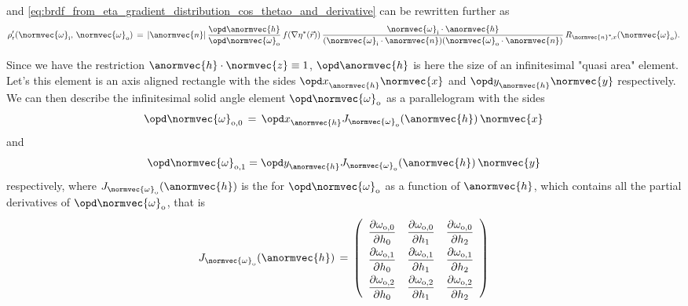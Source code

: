 %
and \eqref{eq:brdf_from_eta_gradient_distribution_cos_thetao_and_derivative} can be rewritten further as
%
\begin{equation}  \label{eq:brdf_from_eta_gradient_distribution_derivative}
\rho'_{\text{r}}(\normvec{\omega}_{\text{i}},\, \normvec{\omega}_{\text{o}}) \,=\, |\anormvec{n}|\,\frac{\opd\anormvec{h}}{\opd\normvec{\omega}_{\text{o}}}\,f(\nabla\eta^*(\vec{r}))\,\frac{\normvec{\omega}_{\text{i}}\cdot\anormvec{h}}{(\normvec{\omega}_{\text{i}}\cdot\anormvec{n})(\normvec{\omega}_{\text{o}}\cdot\anormvec{n})}\,R_{\normvec{n}^*\!,x}(\normvec{\omega}_{\text{o}}).
\end{equation}

Since we have the restriction $\anormvec{h}\cdot\normvec{z}\equiv 1$, $\opd\anormvec{h}$ is here the size of an infinitesimal "quasi area" element. Let's \assume this element is an axis aligned rectangle with the sides $\opd x_{\anormvec{h}}^{\,}\normvec{x}$ and $\opd y_{\anormvec{h}}^{\,}\normvec{y}$ respectively. We can then describe the infinitesimal solid angle element $\opd\normvec{\omega}_{\text{o}}$ as a parallelogram with the sides
%
\begin{equation} \label{eq:domega0}
\opd\normvec{\omega}_{\text{o},0} \,=\, \opd x_{\anormvec{h}}^{\,}J_{\normvec{\omega}_{\text{o}}}(\anormvec{h})^{\,}\normvec{x}
\end{equation}
%
and
%
\begin{equation} \label{eq:domega1}
\opd\normvec{\omega}_{\text{o},1} = \opd y_{\anormvec{h}}^{\,}J_{\normvec{\omega}_{\text{o}}}(\anormvec{h})^{\,}\normvec{y}
\end{equation}
%
respectively, where $J_{\normvec{\omega}_{\text{o}}}(\anormvec{h})$ is the  for $\opd\normvec{\omega}_{\text{o}}$ as a function of $\anormvec{h}$, which contains all the partial derivatives of $\opd\normvec{\omega}_{\text{o}}$, that is
%
\begin{equation} \label{eq:jacobian_matrix}
J_{\normvec{\omega}_{\text{o}}}(\anormvec{h}) \,=\, \renewcommand*{\arraystretch}{2} \left( \begin{array}{ccc}
\displaystyle \frac{\partial\omega_{\text{o},0}}{\partial h_0} &
\displaystyle \frac{\partial\omega_{\text{o},0}}{\partial h_1} &
\displaystyle \frac{\partial\omega_{\text{o},0}}{\partial h_2} \\
\displaystyle \frac{\partial\omega_{\text{o},1}}{\partial h_0} &
\displaystyle \frac{\partial\omega_{\text{o},1}}{\partial h_1} &
\displaystyle \frac{\partial\omega_{\text{o},1}}{\partial h_2} \\
\displaystyle \frac{\partial\omega_{\text{o},2}}{\partial h_0} &
\displaystyle \frac{\partial\omega_{\text{o},2}}{\partial h_1} &
\displaystyle \frac{\partial\omega_{\text{o},2}}{\partial h_2} 
\end{array} \right)
\end{equation}

